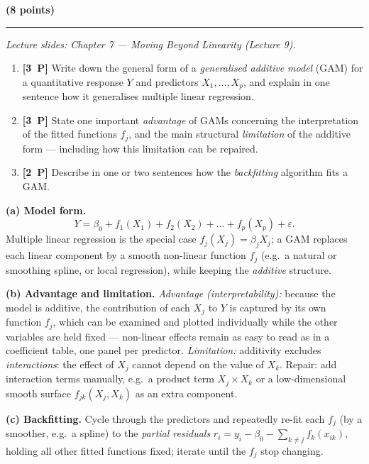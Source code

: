 \documentclass[11pt,a4paper]{article}
\newcommand{\problem}[2]{\par\vspace{7mm}\noindent{\large\textbf{Problem #1}}%
  \hfill{\large\textbf{(#2 points)}}\par\nopagebreak\vspace{0.6mm}%
  \noindent\rule{\textwidth}{0.6pt}\par\nopagebreak\vspace{2.5mm}}
\newcommand{\pp}[1]{\textbf{[#1~P]}\enspace}
\begin{document}
\problem{2: Generalised additive models}{8}
{\small\itshape Lecture slides: Chapter 7 --- Moving Beyond Linearity (Lecture 9).}\par\vspace{1mm}

\begin{enumerate}[label=(\alph*),leftmargin=7mm,itemsep=2.5mm]
  \item \pp{3} Write down the general form of a \emph{generalised additive model} (GAM) for a
    quantitative response $Y$ and predictors $X_1,\dots,X_p$, and explain in one sentence how it
    generalises multiple linear regression.
  \item \pp{3} State one important \emph{advantage} of GAMs concerning the interpretation of the
    fitted functions $f_j$, and the main structural \emph{limitation} of the additive form ---
    including how this limitation can be repaired.
  \item \pp{2} Describe in one or two sentences how the \emph{backfitting} algorithm fits a GAM.
\end{enumerate}

\ifdefined\withsolutions
\begin{solutionbox}
\textbf{(a) Model form.}
\[
  Y=\beta_0+f_1(X_1)+f_2(X_2)+\dots+f_p(X_p)+\varepsilon .
\]
Multiple linear regression is the special case $f_j(X_j)=\beta_jX_j$; a GAM replaces each linear
component by a smooth non-linear function $f_j$ (e.g.\ a natural or smoothing spline, or local
regression), while keeping the \emph{additive} structure.

\medskip
\textbf{(b) Advantage and limitation.}
\emph{Advantage (interpretability):} because the model is additive, the contribution of each
$X_j$ to $Y$ is captured by its own function $f_j$, which can be examined and plotted
individually while the other variables are held fixed --- non-linear effects remain as easy to
read as in a coefficient table, one panel per predictor.
\emph{Limitation:} additivity excludes \emph{interactions}: the effect of $X_j$ cannot depend
on the value of $X_k$. Repair: add interaction terms manually, e.g.\ a product term
$X_j\times X_k$ or a low-dimensional smooth surface $f_{jk}(X_j,X_k)$ as an extra component.

\medskip
\textbf{(c) Backfitting.}
Cycle through the predictors and repeatedly re-fit each $f_j$ (by a smoother, e.g.\ a spline)
to the \emph{partial residuals} $r_i=y_i-\beta_0-\sum_{k\ne j}f_k(x_{ik})$, holding all other
fitted functions fixed; iterate until the $f_j$ stop changing.
\end{solutionbox}
\fi
\end{document}
